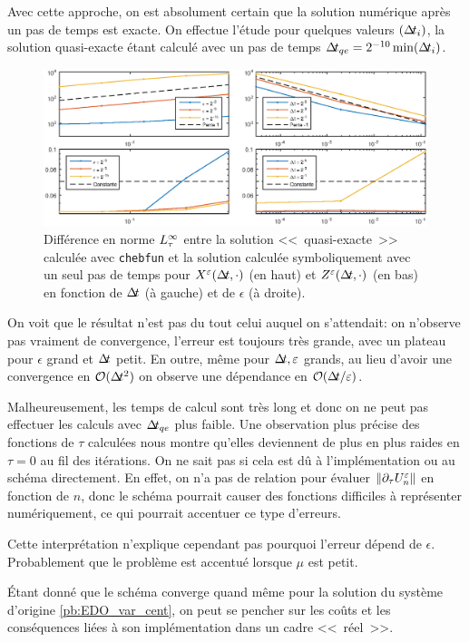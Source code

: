 Avec cette approche, on est absolument certain que la solution numérique après un pas de temps est exacte. 
On effectue l'étude pour quelques valeurs $(\Delta\!\!\!\ t_i)$, la solution quasi-exacte étant calculé avec un pas de temps $\Delta\!\!\!\ t_{qe} = 2^{-10}\min(\Delta\!\!\!\ t_i)$. 

\begin{figure}[!h]
\centering
\includegraphics[width=\textwidth]{img/chap3/cheb/conv_cheb_one_step_cas1.eps}
\caption{Différence en norme $L^{\infty}_{\tau}$ entre la solution <<~quasi-exacte~>> calculée avec \texttt{chebfun} et la solution calculée symboliquement avec un seul pas de temps pour $X^{\varepsilon}(\Delta\!\!\!\ t,\cdot)$ (en haut) et $Z^{\varepsilon}(\Delta\!\!\!\ t,\cdot)$ (en bas) en fonction de $\Delta\!\!\!\ t$ (à gauche) et de $\epsilon$ (à droite).}
\end{figure}

On voit que le résultat n'est pas du tout celui auquel on s'attendait: on n'observe pas vraiment de convergence, l'erreur est toujours très grande, avec un plateau pour $\epsilon$ grand et $\Delta\!\!\!\ t$ petit. 
En outre, même pour $\Delta\!\!\!\ t,\varepsilon$ grands, au lieu d'avoir une convergence en $\mathcal{O}(\Delta\!\!\!\ t^2)$ on observe une dépendance en $\mathcal{O}(\Delta\!\!\!\ t/\varepsilon)$. 

Malheureusement, les temps de calcul sont très long et donc on ne peut pas effectuer les calculs avec $\Delta\!\!\!\ t_{qe}$ plus faible. 
Une observation plus précise des fonctions de $\tau$ calculées nous montre qu'elles deviennent de plus en plus raides en $\tau = 0$ au fil des itérations. 
On ne sait pas si cela est dû à l'implémentation ou au schéma directement. 
En effet, on n'a pas de relation pour évaluer $\|\partial_{\tau} U_n^{\varepsilon}\|$ en fonction de $n$, donc le schéma pourrait causer des fonctions difficiles à représenter numériquement, ce qui pourrait accentuer ce type d'erreurs. 

Cette interprétation n'explique cependant pas pourquoi l'erreur dépend de $\epsilon$. 
Probablement que le problème est accentué lorsque $\mu$ est petit. 

Étant donné que le schéma converge quand même pour la solution du système d'origine \eqref{pb:EDO_var_cent}, on peut se pencher sur les coûts et les conséquences liées à son implémentation dans un cadre <<~réel~>>.



